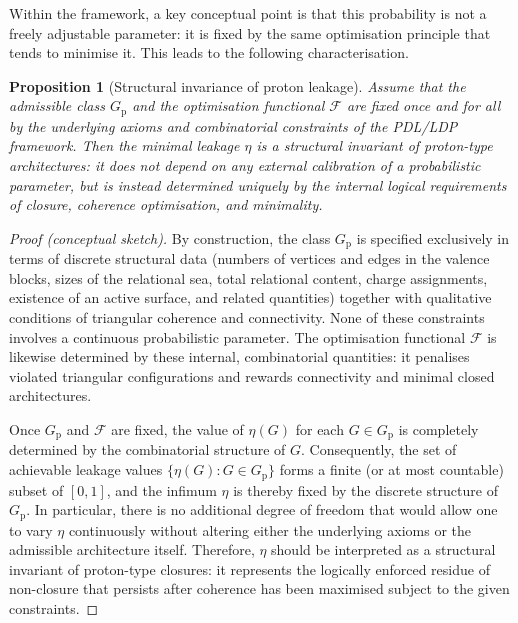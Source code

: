 \documentclass[11pt,a4paper]{article}
\newtheorem{proposition}[theorem]{Proposition}
\theoremstyle{definition}
\newcommand{\Gprot}{G_{\mathrm{p}}}
\newcommand{\etaL}{\eta} %
\newcommand{\Fopt}{\mathcal{F}} %
\begin{document}
Within the framework, a key conceptual point is that this probability is not a freely adjustable parameter: it is fixed by the same optimisation principle that tends to minimise it. This leads to the following characterisation.

\begin{proposition}[Structural invariance of proton leakage]
Assume that the admissible class \(\Gprot\) and the optimisation functional \(\Fopt\) are fixed once and for all by the underlying axioms and combinatorial constraints of the PDL/LDP framework. Then the minimal leakage \(\etaL\) is a structural invariant of proton-type architectures: it does not depend on any external calibration of a probabilistic parameter, but is instead determined uniquely by the internal logical requirements of closure, coherence optimisation, and minimality.
\end{proposition}

\begin{proof}[Proof (conceptual sketch)]
By construction, the class \(\Gprot\) is specified exclusively in terms of discrete structural data (numbers of vertices and edges in the valence blocks, sizes of the relational sea, total relational content, charge assignments, existence of an active surface, and related quantities) together with qualitative conditions of triangular coherence and connectivity. None of these constraints involves a continuous probabilistic parameter. The optimisation functional \(\Fopt\) is likewise determined by these internal, combinatorial quantities: it penalises violated triangular configurations and rewards connectivity and minimal closed architectures.

Once \(\Gprot\) and \(\Fopt\) are fixed, the value of \(\eta(G)\) for each \(G \in \Gprot\) is completely determined by the combinatorial structure of \(G\). Consequently, the set of achievable leakage values \(\{ \eta(G) : G \in \Gprot \}\) forms a finite (or at most countable) subset of \([0,1]\), and the infimum \(\etaL\) is thereby fixed by the discrete structure of \(\Gprot\). In particular, there is no additional degree of freedom that would allow one to vary \(\etaL\) continuously without altering either the underlying axioms or the admissible architecture itself. Therefore, \(\etaL\) should be interpreted as a structural invariant of proton-type closures: it represents the logically enforced residue of non-closure that persists after coherence has been maximised subject to the given constraints.
\end{proof}
\end{document}

